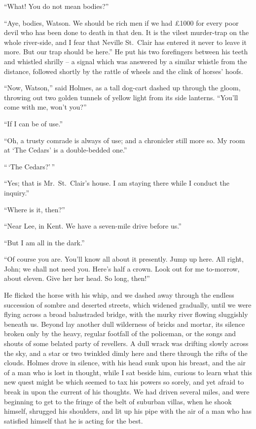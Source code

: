 “What! You do not mean bodies?”

“Aye, bodies, Watson. We should be rich men if we had
£1000 for every poor devil who has been done to death in
that den. It is the vilest murder-trap on the whole river-side,
and I fear that Neville St.~Clair has entered it never to leave
it more. But our trap should be here.” He put his two forefingers
between his teeth and whistled shrilly -- a signal which
was answered by a similar whistle from the distance, followed
shortly by the rattle of wheels and the clink of horses’ hoofs.

“Now, Watson,” said Holmes, as a tall dog-cart dashed up
through the gloom, throwing out two golden tunnels of yellow
light from its side lanterns. “You’ll come with me, won’t
you?”

“If I can be of use.”

“Oh, a trusty comrade is always of use; and a chronicler
still more so. My room at ‘The Cedars’ is a double-bedded
one.”

“\,‘The Cedars?’\,”

“Yes; that is Mr.~St.~Clair’s house. I am staying there
while I conduct the inquiry.”

“Where is it, then?”

“Near Lee, in Kent. We have a seven-mile drive before
us.”

“But I am all in the dark.”

“Of course you are. You’ll know all about it presently.
Jump up here. All right, John; we shall not need you.
Here’s half a crown. Look out for me to-morrow, about
eleven. Give her her head. So long, then!”

He flicked the horse with his whip, and we dashed away
through the endless succession of sombre and deserted streets,
which widened gradually, until we were flying across a broad
balustraded bridge, with the murky river flowing sluggishly
beneath us. Beyond lay another dull wilderness of bricks
and mortar, its silence broken only by the heavy, regular footfall
of the policeman, or the songs and shouts of some belated
party of revellers. A dull wrack was drifting slowly across
the sky, and a star or two twinkled dimly here and there
through the rifts of the clouds. Holmes drove in silence,
with his head sunk upon his breast, and the air of a man who
is lost in thought, while I sat beside him, curious to learn
what this new quest might be which seemed to tax his powers
so sorely, and yet afraid to break in upon the current of his
thoughts. We had driven several miles, and were beginning
to get to the fringe of the belt of suburban villas, when he
shook himself, shrugged his shoulders, and lit up his pipe
with the air of a man who has satisfied himself that he is acting
for the best.

